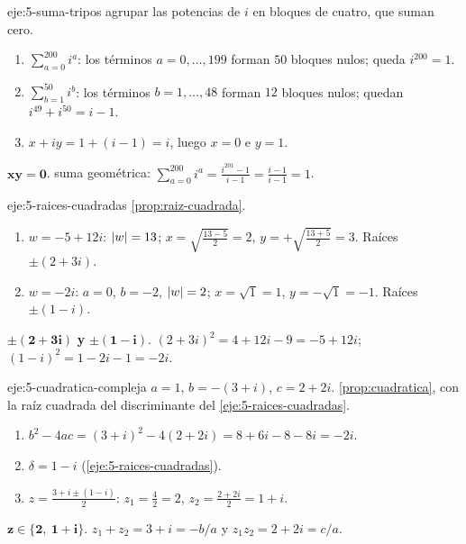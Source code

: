 \begin{solucion}{eje:5-suma-tripos}
\planteamiento agrupar las potencias de $i$ en bloques de cuatro, que suman cero.
\pasos
\begin{enumerate}[label=\arabic*.]
  \item $\sum_{a=0}^{200}i^{a}$: los términos $a=0,\dots,199$ forman $50$ bloques nulos; queda $i^{200}=1$.
  \item $\sum_{b=1}^{50}i^{b}$: los términos $b=1,\dots,48$ forman $12$ bloques nulos; quedan $i^{49}+i^{50}=i-1$.
  \item $x+iy=1+(i-1)=i$, luego $x=0$ e $y=1$.
\end{enumerate}
\resultado $\mathbf{xy=0}$.
\comprobacion suma geométrica: $\sum_{a=0}^{200}i^{a}=\frac{i^{201}-1}{i-1}=\frac{i-1}{i-1}=1$.
\end{solucion}

\begin{solucion}{eje:5-raices-cuadradas}
\planteamiento \cref{prop:raiz-cuadrada}.
\pasos
\begin{enumerate}[label=\arabic*.]
  \item $w=-5+12i$: $\lvert w\rvert=13$; $x=\sqrt{\frac{13-5}{2}}=2$, $y=+\sqrt{\frac{13+5}{2}}=3$. Raíces $\pm(2+3i)$.
  \item $w=-2i$: $a=0$, $b=-2$, $\lvert w\rvert=2$; $x=\sqrt1=1$, $y=-\sqrt1=-1$. Raíces $\pm(1-i)$.
\end{enumerate}
\resultado $\mathbf{\pm(2+3i)}$ \textbf{y} $\mathbf{\pm(1-i)}$.
\comprobacion $(2+3i)^{2}=4+12i-9=-5+12i$; $(1-i)^{2}=1-2i-1=-2i$.
\end{solucion}

\begin{solucion}{eje:5-cuadratica-compleja}
\datos $a=1$, $b=-(3+i)$, $c=2+2i$.
\planteamiento \cref{prop:cuadratica}, con la raíz cuadrada del discriminante del \cref{eje:5-raices-cuadradas}.
\pasos
\begin{enumerate}[label=\arabic*.]
  \item $b^{2}-4ac=(3+i)^{2}-4(2+2i)=8+6i-8-8i=-2i$.
  \item $\delta=1-i$ (\cref{eje:5-raices-cuadradas}).
  \item $z=\frac{3+i\pm(1-i)}{2}$: $z_1=\frac{4}{2}=2$, $z_2=\frac{2+2i}{2}=1+i$.
\end{enumerate}
\resultado $\mathbf{z\in\{2,\ 1+i\}}$.
\comprobacion $z_1+z_2=3+i=-b/a$ y $z_1z_2=2+2i=c/a$.
\end{solucion}

